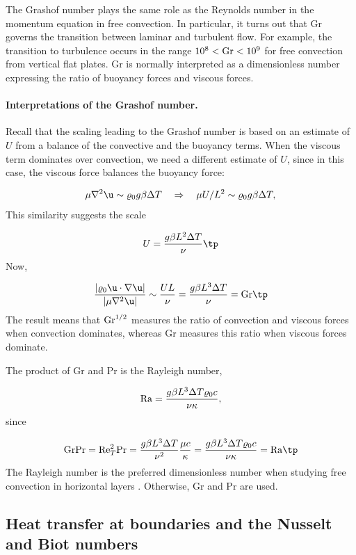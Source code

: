 \documentclass[graybox,envcountchap,sectrefs,final]{svmonodo}
\begin{document}
The Grashof number plays the same
role as the Reynolds number in the momentum equation in free
convection. In particular,
it turns out that Gr governs the transition between laminar and
turbulent flow.  For example, the transition to turbulence occurs in
the range $10^8 < \hbox{Gr} < 10^9$ for free convection from vertical
flat plates.  Gr is normally interpreted as a dimensionless number
expressing the ratio of buoyancy forces and viscous forces.

\paragraph{Interpretations of the Grashof number.}
Recall that the scaling leading to the Grashof number is based on an
estimate of $U$ from a balance of the convective and the buoyancy
terms. When the viscous term dominates over convection, we need a
different estimate of $U$, since in this case, the viscous force
balances the buoyancy force:

\[ \mu\nabla^2\u \sim \varrho_0g\beta\Delta T\quad
\Rightarrow\quad \mu U/L^2 \sim \varrho_0g\beta\Delta T,\]
This similarity suggests the scale

\[ U = \frac{g\beta L^2 \Delta T}{\nu}\tp\]
Now,

\[ \frac{|\varrho_0\u\cdot\nabla\u|}{|\mu\nabla^2\u|} \sim \frac{UL}{\nu}
= \frac{g\beta L^3 \Delta T}{\nu} = \hbox{Gr}\tp\]
The result means that $\hbox{Gr}^{1/2}$ measures the ratio of convection and
viscous forces when convection dominates, whereas Gr measures this ratio when
viscous forces dominate.

The product of Gr and Pr is the Rayleigh number,

\[
\hbox{Ra} = \frac{g\beta L^3\Delta T\varrho_0 c}{\nu\kappa},
\]
since

\[
\hbox{Gr} \hbox{Pr} = \hbox{Re}_T^2\hbox{Pr} =
\frac{g\beta L^3 \Delta T}{\nu^2}\frac{\mu c}{\kappa} =
\frac{g\beta L^3 \Delta T\varrho_0 c}{\nu\kappa} =
\hbox{Ra}\tp
\]
The Rayleigh number is the preferred dimensionless number when studying
free convection in horizontal layers \cite{Drazin_Reid,Tritton}. Otherwise,
Gr and Pr are used.


\subsection{Heat transfer at boundaries and the Nusselt and Biot numbers}

\end{document}
